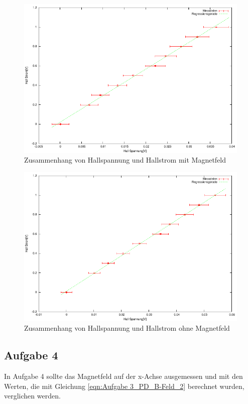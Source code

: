 \documentclass[12pt]{scrartcl}
\begin{document}
\begin{figure}[htbp] 
  \centering
    \includegraphics[scale = 1.3]{aufgabe_3_e_m.pdf}
  	\caption[Zusammenhang von Hallspannung und Hallstrom mit Magnetfeld]{Zusammenhang von Hallspannung und Hallstrom mit Magnetfeld}
  \label{fig:kasten}
\end{figure}

\begin{figure}[htbp] 
  \centering
    \includegraphics[scale = 1.3]{aufgabe_3_e_o.pdf}
  	\caption[Zusammenhang von Hallspannung und Hallstrom ohne Magnetfeld]{Zusammenhang von Hallspannung und Hallstrom ohne Magnetfeld}
  \label{fig:kasten}
\end{figure}

\newpage

\subsection{Aufgabe 4}
In Aufgabe 4 sollte das Magnetfeld auf der x-Achse ausgemessen und mit den Werten, die mit Gleichung \ref{eqn:Aufgabe 3_PD_B-Feld_2} berechnet wurden, verglichen werden.
\end{document}
